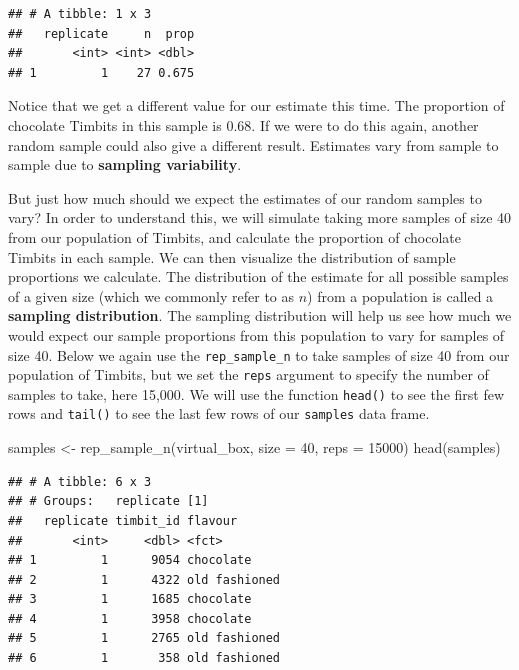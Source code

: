 \documentclass[
]{krantz}
\makeatletter
\newenvironment{Shaded}{\begin{snugshade}}{\end{snugshade}}
\newcommand{\AttributeTok}[1]{\textcolor[rgb]{0.61,0.61,0.61}{#1}}
\newcommand{\DecValTok}[1]{\textcolor[rgb]{0.06,0.06,0.06}{#1}}
\newcommand{\FunctionTok}[1]{\textcolor[rgb]{0,0,0}{#1}}
\newcommand{\NormalTok}[1]{#1}
\newcommand{\OtherTok}[1]{\textcolor[rgb]{0.37,0.37,0.37}{#1}}
\newenvironment{kframe}{%
\medskip{}
\setlength{\fboxsep}{.8em}
 \def\at@end@of@kframe{}%
 \ifinner\ifhmode%
  \def\at@end@of@kframe{\end{minipage}}%
  \begin{minipage}{\columnwidth}%
 \fi\fi%
 \def\FrameCommand##1{\hskip\@totalleftmargin \hskip-\fboxsep
 \colorbox{shadecolor}{##1}\hskip-\fboxsep
     \hskip-\linewidth \hskip-\@totalleftmargin \hskip\columnwidth}%
 \MakeFramed {\advance\hsize-\width
   \@totalleftmargin\z@ \linewidth\hsize
   \@setminipage}}%
 {\par\unskip\endMakeFramed%
 \at@end@of@kframe}
\renewenvironment{Shaded}{\begin{kframe}}{\end{kframe}}
\makeatother
\begin{document}
\begin{verbatim}
## # A tibble: 1 x 3
##   replicate     n  prop
##       <int> <int> <dbl>
## 1         1    27 0.675
\end{verbatim}

Notice that we get a different value for our estimate this time. The
proportion of chocolate Timbits in this sample is 0.68.
If we were to do this again, another random sample could also give a
different result. Estimates vary from sample to sample
due to \textbf{sampling variability}.

But just how much should we expect the estimates of our random
samples to vary? In order to understand this, we will simulate taking more samples
of size 40 from our population of Timbits, and calculate the
proportion of chocolate Timbits in each sample. We can then
visualize the distribution of sample proportions we calculate. The distribution
of the estimate for all possible samples of a given size (which we commonly refer to as \(n\)) from a population is
called a \textbf{sampling distribution}. The sampling distribution will help us see
how much we would expect our sample proportions from this population to vary
for samples of size 40. Below we again use the \texttt{rep\_sample\_n} to take samples
of size 40 from our population of Timbits, but we set the \texttt{reps} argument
to specify the number of samples to take, here 15,000. We will use the function \texttt{head()} to see the first few rows and \texttt{tail()} to see the last few rows of our \texttt{samples} data frame.

\begin{Shaded}
\begin{Highlighting}[]
\NormalTok{samples }\OtherTok{\textless{}{-}} \FunctionTok{rep\_sample\_n}\NormalTok{(virtual\_box, }\AttributeTok{size =} \DecValTok{40}\NormalTok{, }\AttributeTok{reps =} \DecValTok{15000}\NormalTok{)}
\FunctionTok{head}\NormalTok{(samples)}
\end{Highlighting}
\end{Shaded}

\begin{verbatim}
## # A tibble: 6 x 3
## # Groups:   replicate [1]
##   replicate timbit_id flavour      
##       <int>     <dbl> <fct>        
## 1         1      9054 chocolate    
## 2         1      4322 old fashioned
## 3         1      1685 chocolate    
## 4         1      3958 chocolate    
## 5         1      2765 old fashioned
## 6         1       358 old fashioned
\end{verbatim}
\end{document}

